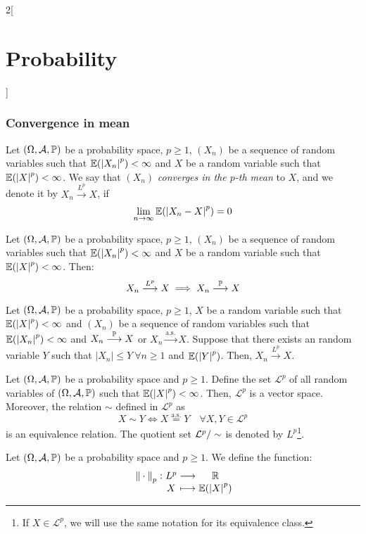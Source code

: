 \documentclass[../../../main.tex]{subfiles}
\begin{document}
\begin{multicols}{2}[\section{Probability}]
  \subsubsection{Convergence in mean}
  \begin{definition}
    Let $(\Omega,\mathcal{A},\mathbb{P})$ be a probability space, $p\geq 1$, $(X_n)$ be a sequence of random variables such that $\mathbb{E}({|X_n|}^p)<\infty$ and $X$ be a random variable such that $\mathbb{E}({|X|}^p)<\infty$. We say that $(X_n)$ \textit{converges in the $p$-th mean} to $X$, and we denote it by $X_n\overset{L^p}{\longrightarrow} X$, if  $$\lim_{n\to\infty}\mathbb{E}({|X_n-X|}^p)=0$$
  \end{definition}
  \begin{prop}
    Let $(\Omega,\mathcal{A},\mathbb{P})$ be a probability space, $p\geq 1$, $(X_n)$ be a sequence of random variables such that $\mathbb{E}({|X_n|}^p)<\infty$ and $X$ be a random variable such that $\mathbb{E}({|X|}^p)<\infty$. Then:
    $$X_n\overset{L^p}{\longrightarrow} X\implies X_n\overset{\mathbb{P}}{\longrightarrow} X$$
  \end{prop}
  \begin{theorem}
    Let $(\Omega,\mathcal{A},\mathbb{P})$ be a probability space, $p\geq 1$, $X$ be a random variable such that $\mathbb{E}({|X|}^p)<\infty$ and $(X_n)$ be a sequence of random variables such that $\mathbb{E}({|X_n|}^p)<\infty$ and $X_n\overset{\mathbb{P}}{\longrightarrow}X$ or $X_n\overset{\text{a.s.}}{\longrightarrow}X$. Suppose that there exists an random variable $Y$ such that $|X_n|\leq Y\ \forall n\geq 1$ and $\mathbb{E}({|Y|}^p)$. Then, $X_n\overset{L^p}{\longrightarrow} X$.
  \end{theorem}
  \begin{lemma}
    Let $(\Omega,\mathcal{A},\mathbb{P})$ be a probability space and $p\geq 1$. Define the set $\mathcal{L}^p$ of all random variables of $(\Omega,\mathcal{A},\mathbb{P})$ such that $\mathbb{E}({|X|}^p)<\infty$. Then, $\mathcal{L}^p$ is a vector space. Moreover, the relation $\sim$ defined in $\mathcal{L}^p$ as $$X\sim Y\iff X\overset{\text{a.s.}}{=} Y\quad\forall X,Y\in\mathcal{L}^p$$ is an equivalence relation. The quotient set $\quot{\mathcal{L}^p}{\sim}$ is denoted by $L^p$\footnote{If $X\in\mathcal{L}^p$, we will use the same notation for its equivalence class.}.
  \end{lemma}
  \begin{prop}
    Let $(\Omega,\mathcal{A},\mathbb{P})$ be a probability space and $p\geq 1$. We define the function:
    $$
      \function{{\|\cdot\|}_p}{L^p}{\RR}{X}{\Exp({|X|}^p)}
$$
\end{prop}
\end{multicols}
\end{document}
